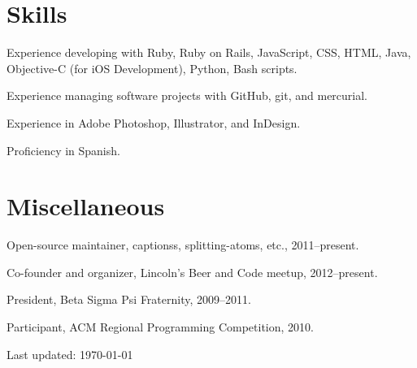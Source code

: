 \documentclass[10pt,letterpaper]{article}
\renewenvironment{itemize}{
  \begin{list}{}{
    \setlength{\leftmargin}{1.5em}
    \setlength{\itemsep}{0.25em}
    \setlength{\parskip}{0pt}
    \setlength{\parsep}{0.25em}
  }
}{
  \end{list}
}
\begin{document}

\section*{Skills}

\begin{itemize}
    \item Experience developing with Ruby, Ruby on Rails, JavaScript, CSS, HTML, Java,
    Objective-C (for iOS Development), Python, Bash scripts.
    \item Experience managing software projects with GitHub, git, and mercurial.
    \item Experience in Adobe Photoshop, Illustrator, and InDesign.
    \item Proficiency in Spanish.
\end{itemize}

\section*{Miscellaneous}

\begin{itemize}
    \item Open-source maintainer, captionss, splitting-atoms, etc., 2011--present.
    \item Co-founder and organizer, Lincoln's Beer and Code meetup, 2012--present.
    \item President, Beta Sigma Psi Fraternity, 2009--2011.
    \item Participant, ACM Regional Programming Competition, 2010.
\end{itemize}

\bigskip

\begin{center}
  \begin{small}
    Last updated: \today
  \end{small}
\end{center}
\end{document}
